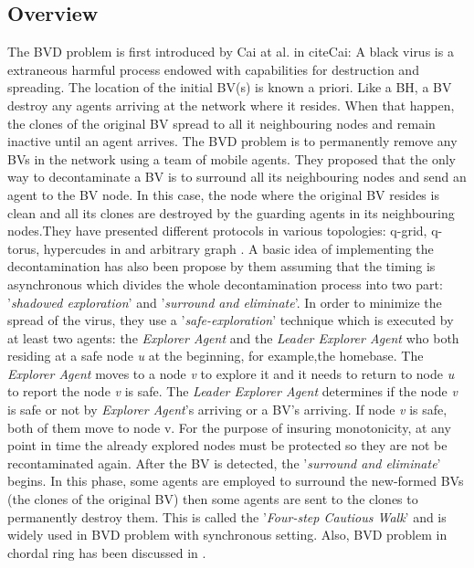 \subsection{Overview}
The BVD problem is first introduced by Cai at al. in cite{Cai}: A black virus is a  extraneous harmful process endowed with capabilities for destruction and spreading. The location of the initial BV(s) is known a priori. Like a BH, a BV destroy any agents arriving at the network where it resides. When that happen, the clones of the original BV spread to all it neighbouring nodes and remain inactive until an agent arrives. The BVD problem is to permanently remove any BVs in the network using a team of mobile agents. They proposed that the only way to decontaminate a BV is to surround all its neighbouring nodes and send an agent to the BV node. In this case, the node where the original BV resides is clean and all its clones are destroyed by the guarding agents in its neighbouring nodes.They have presented different protocols in various topologies: q-grid, q-torus, hypercudes in \cite{Cai} and arbitrary graph \cite{Cai1}. A basic idea of implementing the decontamination has also been propose by them assuming that the timing is asynchronous which divides the whole decontamination process into two part: '{\em shadowed exploration}' and '{\em surround and eliminate}'. In order to minimize the spread of the virus, they use a '{\em safe-exploration}' technique which is executed by at least two agents: the {\em Explorer Agent} and the {\em Leader Explorer Agent} who both residing at a safe node {\em u} at the beginning, for example,the homebase. The {\em Explorer Agent} moves to a node {\em v} to explore it and it needs to return to node {\em u} to report the node {\em v} is safe. The {\em Leader Explorer Agent} determines if the node {\em v} is safe or not by {\em Explorer Agent}'s arriving or a BV's arriving. If node {\em v} is safe, both of them move to node v. For the purpose of insuring monotonicity, at any point in time the already explored nodes must be protected so they are not be recontaminated again. After the BV is detected, the '{\em surround and eliminate}' begins. In this phase, some agents are employed to surround the new-formed BVs (the clones of the original BV) then some agents are sent to the clones to permanently destroy them. This is called the '{\em Four-step Cautious Walk}' and is widely used in BVD problem with synchronous setting. Also, BVD problem in chordal ring has been discussed in
\cite{Alotaibi}.

